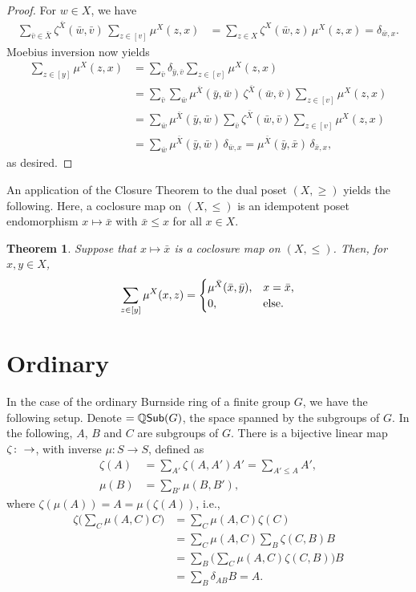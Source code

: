 \documentclass[12pt,a4paper]{amsart}
\let\SS\relax
\newcommand{\SS}{\mathcal{S}}
\newcommand{\Q}{\mathbb{Q}}
\newcommand{\Sub}{\mathsf{Sub}}
\newtheorem{theorem}{Theorem}[section]
\begin{document}
\begin{proof}
  For $w \in X$, we have
  \begin{align*}
    \sum_{\bar{v} \in \bar{X}} \zeta^{\bar{X}}(\bar{w}, \bar{v})\, \sum_{z \in [v]} \mu^X(z, x)
    &= \sum_{z \in X} \zeta^X(\bar{w}, z)\, \mu^X(z, x)  = \delta_{\bar{w},x}.
  \end{align*}
Moebius inversion now yields
\begin{align*}
  \sum_{z \in [y]} \mu^X(z, x)
&= \sum_{\bar{v}} \delta_{\bar{y},\bar{v}} \sum_{z \in [v]} \mu^X(z, x) \\
&= \sum_{\bar{v}} \sum_{\bar{w}} \mu^{\bar{X}} (\bar{y}, \bar{w})\, \zeta^{\bar{X}}(\bar{w}, \bar{v}) \sum_{z \in [v]} \mu^X(z, x) \\
&= \sum_{\bar{w}}  \mu^{\bar{X}} (\bar{y}, \bar{w}) \sum_{\bar{v}} \zeta^{\bar{X}}(\bar{w}, \bar{v}) \sum_{z \in [v]} \mu^X(z, x) \\
&= \sum_{\bar{w}}  \mu^{\bar{X}} (\bar{y}, \bar{w})\, \delta_{\bar{w}, x}
=  \mu^{\bar{X}} (\bar{y}, \bar{x})\, \delta_{\bar{x}, x},
\end{align*}
as desired.
\end{proof}

An application of the Closure Theorem to the dual poset $(X, \geq)$
yields the following.  Here, a coclosure map on $(X, \leq)$ is an
idempotent poset endomorphism $x \mapsto \bar{x}$ with $\bar{x} \leq x$
for all $x \in X$.
\begin{theorem}
Suppose that $x \mapsto \bar{x}$ is a coclosure map on $(X, \leq)$.  Then,
for $x, y \in X$,
\begin{align*}
  \sum_{z \in [y]} \mu^X(x, z) =
  \begin{cases}
    \mu^{\bar{X}}(\bar{x}, \bar{y})\text, & x = \bar{x}\text, \\
0\text, & \text{else.}
  \end{cases}
\end{align*}
\end{theorem}

\section{Ordinary}

In the case of the ordinary Burnside ring of a finite group $G$, we
have the following setup.  Denote $\SS = \Q \Sub(G)$, the space spanned
by the subgroups of $G$.
In the following, $A$, $B$  and $C$ are subgroups of $G$.
There is a bijective linear map $\zeta \colon \SS \to \SS$, with inverse $\mu \colon S \to S$, defined as
\begin{align*}
  \zeta(A) &= \sum_{A'} \zeta(A, A') A' = \sum_{A' \leq A} A',\\
  \mu(B) &= \sum_{B'} \mu(B, B'),
\end{align*}
where $\zeta(\mu(A)) = A = \mu(\zeta(A))$, i.e.,
\begin{align*}
  \zeta\biggl(\sum_C \mu(A, C) C\biggr) &= \sum_C \mu(A, C) \zeta(C) \\
&= \sum_C \mu(A, C) \sum_B \zeta(C, B) B \\
&= \sum_B \biggl(\sum_C \mu(A, C) \zeta(C, B) \biggr) B \\
&= \sum_B \delta_{AB} B = A.
\end{align*}
\end{document}
